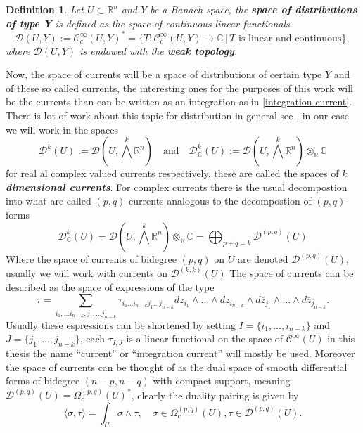 \documentclass[12pt,twoside,a4paper]{report}
\newtheorem{definition}{Definition}[section]
\newcommand{\re}{\ensuremath{\mathbb R }}
\newcommand{\co}{\ensuremath{\mathbb C }}
\newcommand{\om}{\ensuremath{\Omega}}
\newcommand{\csheaf}{\ensuremath{\mathcal C }}
\newcommand{\dsheaf}{\ensuremath{\mathcal D }}
\begin{document}
\begin{definition}\label{distribution}
  Let $U\subset\re^n$ and $Y$ be a Banach space, the {\bf space of distributions of type Y} is defined as the space of continuous linear functionals
  \begin{equation}
    \dsheaf(U,Y):=\csheaf^{\infty}_c(U,Y)^{*}=\{T:\csheaf^{\infty}_c(U,Y)\to\co\,|\,T\text{ is linear and continuous}\},
  \end{equation}
  where $\dsheaf(U,Y)$ is endowed with the {\bf weak topology}.  
\end{definition}
Now, the space of currents will be a space of distributions of certain type $Y$ and of these so called currents, the interesting ones for the purposes of this work will be the currents than can be written as an integration as in \ref{integration-current}. There is lot of work about this topic for distribution in general see \cite{federer}, in our case we will work in the spaces
\begin{equation}
\dsheaf^{k}(U):=\dsheaf(U,\bigwedge^k\re^n)\quad\text{and}\quad\dsheaf_{\co}^{k}(U):=\dsheaf(U,\bigwedge^k\re^n)\otimes_{\re}\co
\end{equation}
for real al complex valued currents respectively, these are called the spaces of $k$ {\bf\emph{dimensional currents}}. For complex currents there is the usual decompostion into what are called $(p,q)$-currents analogous to the decompostion of $(p,q)$-forms
\[
  \dsheaf_{\co}^{k}(U)=\dsheaf(U,\bigwedge^k\re^n)\otimes_{\re}\co=\bigoplus_{p+q=k}\dsheaf^{(p,q)}(U)
\]
Where the space of currents of bidegree $(p,q)$ on $U$ are denoted $\dsheaf^{(p,q)}(U)$, usually we will work with currents on $\dsheaf^{(k,k)}(U)$
The space of currents can be described as the space of expressions of the type
\begin{equation}
    \tau=\sum_{i_1,\dots i_{n-k},j_1,\dots j_{n-k}}\tau_{i_1\dots i_{n-k}j_1\dots j_{n-k}} dz_{i_1}\wedge\dots\wedge dz_{i_{n-k}}\wedge d\overline{z}_{j_1}\wedge\dots\wedge d\overline{z}_{j_{n-k}}.
\end{equation}
Usually these espressions can be shortened by setting $I=\{i_1,\dots,i_{n-k}\}$ and $J=\{j_1,\dots,j_{n-k}\}$, each $\tau_{I,J}$ is a linear functional on the space of $\csheaf^{\infty}(U)$ in this thesis the name ``current'' or ``integration current'' will mostly be used. Moreover the space of currents can be thought of as the dual space of smooth differential forms of bidegree $(n-p,n-q)$ with compact support, meaning $\dsheaf^{(p,q)}(U)=\om_c^{(p,q)}(U)^*$, clearly the duality pairing is given by
\begin{equation}
  \langle\sigma,\tau\rangle=\int_U\sigma\wedge\tau,\quad\sigma\in\om_c^{(p,q)}(U),\tau\in\dsheaf^{(p,q)}(U).
\end{equation}
\end{document}
